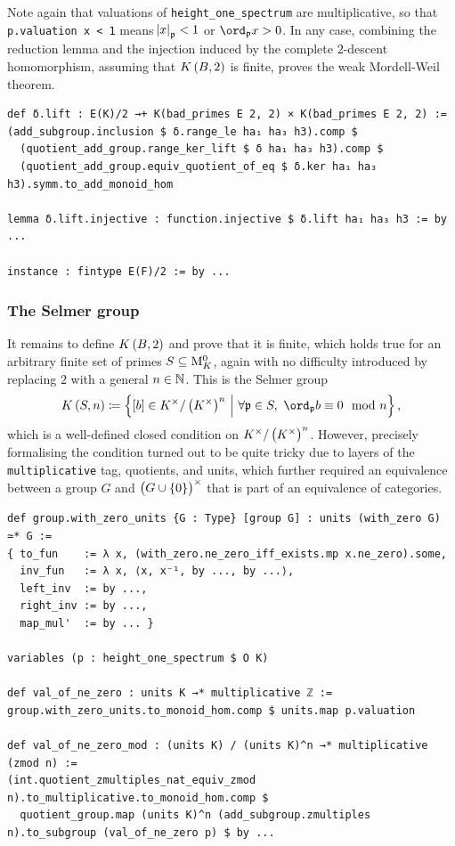 Note again that valuations of \texttt{height\_one\_spectrum} are multiplicative, so that \texttt{p.valuation x < 1} means $ \abs{x}_{\mathfrak{p}} < 1 $ or $ \ord_\ppp x > 0 $. In any case, combining the reduction lemma and the injection induced by the complete $ 2 $-descent homomorphism, assuming that $ K\br{B, 2} $ is finite, proves the weak Mordell-Weil theorem.

\begin{lstlisting}[frame=single]
def δ.lift : E(K)/2 →+ K(bad_primes E 2, 2) × K(bad_primes E 2, 2) :=
(add_subgroup.inclusion $ δ.range_le ha₁ ha₃ h3).comp $
  (quotient_add_group.range_ker_lift $ δ ha₁ ha₃ h3).comp $
  (quotient_add_group.equiv_quotient_of_eq $ δ.ker ha₁ ha₃ h3).symm.to_add_monoid_hom

lemma δ.lift.injective : function.injective $ δ.lift ha₁ ha₃ h3 := by ...

instance : fintype E(F)/2 := by ...
\end{lstlisting}

\subsubsection{The Selmer group}

It remains to define $ K\br{B, 2} $ and prove that it is finite, which holds true for an arbitrary finite set of primes $ S \subseteq \mathrm{M}_K^0 $, again with no difficulty introduced by replacing $ 2 $ with a general $ n \in \mathbb{N} $. This is the Selmer group
$$ K\br{S, n} \coloneqq \cbr{\sbr{b} \in K^\times / \br{K^\times}^n \st \forall \ppp \in S, \ \ord_\ppp b \equiv 0 \mod n}, $$
which is a well-defined closed condition on $ K^\times / \br{K^\times}^n $. However, precisely formalising the condition turned out to be quite tricky due to layers of the \texttt{multiplicative} tag, quotients, and units, which further required an equivalence between a group $ G $ and $ \br{G \cup \cbr{0}}^\times $ that is part of an equivalence of categories.

\begin{lstlisting}[frame=single]
def group.with_zero_units {G : Type} [group G] : units (with_zero G) ≃* G :=
{ to_fun    := λ x, (with_zero.ne_zero_iff_exists.mp x.ne_zero).some,
  inv_fun   := λ x, ⟨x, x⁻¹, by ..., by ...⟩,
  left_inv  := by ...,
  right_inv := by ...,
  map_mul'  := by ... }

variables (p : height_one_spectrum $ O K)

def val_of_ne_zero : units K →* multiplicative ℤ :=
group.with_zero_units.to_monoid_hom.comp $ units.map p.valuation

def val_of_ne_zero_mod : (units K) / (units K)^n →* multiplicative (zmod n) :=
(int.quotient_zmultiples_nat_equiv_zmod n).to_multiplicative.to_monoid_hom.comp $
  quotient_group.map (units K)^n (add_subgroup.zmultiples n).to_subgroup (val_of_ne_zero p) $ by ...
\end{lstlisting}


